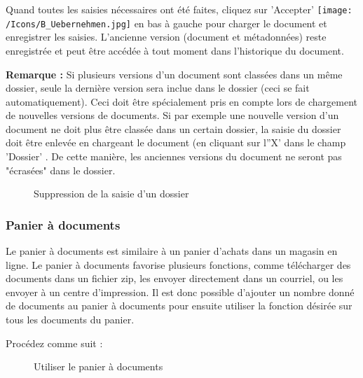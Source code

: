 \vspace{\baselineskip}

Quand toutes les saisies nécessaires ont été faites, cliquez sur 'Accepter' \texttt{[image: /Icons/B\_Uebernehmen.jpg]} en bas à gauche pour charger le document et enregistrer les saisies. L'ancienne version (document et métadonnées) reste enregistrée et peut être accédée à tout moment dans l'historique du document.

\vspace{\baselineskip}
\vspace{\baselineskip}

\textbf{Remarque :} Si plusieurs versions d'un document sont classées dans un même dossier, seule la dernière version sera inclue dans le dossier (ceci se fait automatiquement). Ceci doit être spécialement pris en compte lors de chargement de nouvelles versions de documents. Si par exemple une nouvelle version d'un document ne doit plus être classée dans un certain dossier, la saisie du dossier doit être enlevée en chargeant le document (en cliquant sur l''X' dans le champ 'Dossier' . De cette manière, les anciennes versions du document ne seront pas "écrasées" dans le dossier.

\begin{figure}[H]
\caption{Suppression de la saisie d'un dossier}
\end{figure}


\subsubsection{Panier à documents}
\label{bkm:Ref201705445}

Le panier à documents est similaire à un panier d'achats dans un magasin en ligne. Le panier à documents favorise plusieurs fonctions, comme télécharger des documents dans un fichier zip, les envoyer directement dans un courriel, ou les envoyer à un centre d'impression. Il est donc possible d'ajouter un nombre donné de documents au panier à documents pour ensuite utiliser la fonction désirée sur tous les documents du panier.

\vspace{\baselineskip}

Procédez comme suit :

\begin{figure}[H]
\caption{Utiliser le panier à documents}
\end{figure}

